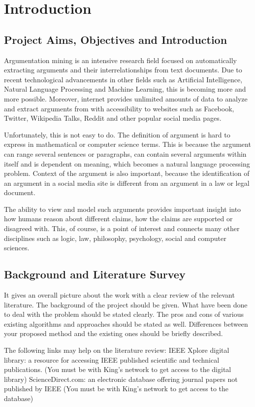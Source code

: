 \section{Introduction}
\subsection{Project Aims, Objectives and Introduction} 
 Argumentation mining is an intensive research field focused on automatically extracting arguments and their interrelationships from text documents. Due to recent technological advancements in other fields such as Artificial Intelligence, Natural Language Processing and Machine Learning, this is becoming more and more possible. Moreover, internet provides unlimited amounts of data to analyze and extract arguments from with accessibility to websites such as Facebook, Twitter, Wikipedia Talks, Reddit and other popular social media pages. 
 
 Unfortunately, this is not easy to do. The definition of argument is hard to express in mathematical or computer science terms. This is because the argument can range several sentences or paragraphs, can contain several arguments within itself and is dependent on meaning, which becomes a natural language processing problem. Context of the argument is also important, because the identification of an argument in a social media site is different from an argument in a law or legal document.

The ability to view and model such arguments provides important insight into how humans reason about different claims, how the claims are supported or disagreed with. This, of course, is a point of interest and connects many other disciplines such as logic, law, philosophy, psychology, social and computer sciences. 

\subsection{Background and Literature Survey} \label{sub:background}
 It gives an overall picture about the work with a clear review of the relevant literature.  The background of the project should be given.  What have been done to deal with the problem should be stated clearly.  The pros and cons of various existing algorithms and approaches should be stated as well.  Differences between your proposed method and the existing ones should be briefly described. 

The following links may help on the literature review: IEEE Xplore digital library: a resource for accessing IEEE published scientific and technical publications. (You must be with King's network to get access to the digital library) ScienceDirect.com: an electronic database offering journal papers not published by IEEE (You must be with King's network to get access to the database)
